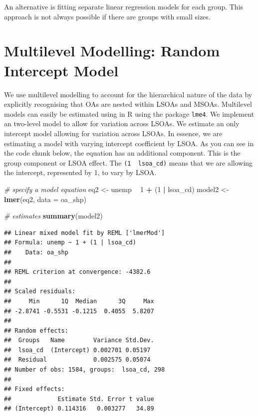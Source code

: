 \documentclass[]{book}
\newenvironment{Shaded}{\begin{snugshade}}{\end{snugshade}}
\newcommand{\KeywordTok}[1]{\textcolor[rgb]{0.13,0.29,0.53}{\textbf{#1}}}
\newcommand{\DataTypeTok}[1]{\textcolor[rgb]{0.13,0.29,0.53}{#1}}
\newcommand{\DecValTok}[1]{\textcolor[rgb]{0.00,0.00,0.81}{#1}}
\newcommand{\StringTok}[1]{\textcolor[rgb]{0.31,0.60,0.02}{#1}}
\newcommand{\CommentTok}[1]{\textcolor[rgb]{0.56,0.35,0.01}{\textit{#1}}}
\newcommand{\OperatorTok}[1]{\textcolor[rgb]{0.81,0.36,0.00}{\textbf{#1}}}
\newcommand{\NormalTok}[1]{#1}
\begin{document}
An alternative is fitting separate linear regression models for each
group. This approach is not always possible if there are groups with
small sizes.

\section{Multilevel Modelling: Random Intercept
Model}\label{multilevel-modelling-random-intercept-model}

We use multilevel modelling to account for the hierarchical nature of
the data by explicitly recognising that OAs are nested within LSOAs and
MSOAs. Multilevel models can easily be estimated using in R using the
package \texttt{lme4}. We implement an two-level model to allow for
variation across LSOAs. We estimate an only intercept model allowing for
variation across LSOAs. In essence, we are estimating a model with
varying intercept coefficient by LSOA. As you can see in the code chunk
below, the equation has an additional component. This is the group
component or LSOA effect. The \texttt{(1\ \textbar{}\ lsoa\_cd)} means
that we are allowing the intercept, represented by 1, to vary by LSOA.

\begin{Shaded}
\begin{Highlighting}[]
\CommentTok{# specify a model equation}
\NormalTok{eq2 <-}\StringTok{ }\NormalTok{unemp }\OperatorTok{~}\StringTok{ }\DecValTok{1} \OperatorTok{+}\StringTok{ }\NormalTok{(}\DecValTok{1} \OperatorTok{|}\StringTok{ }\NormalTok{lsoa_cd)}
\NormalTok{model2 <-}\StringTok{ }\KeywordTok{lmer}\NormalTok{(eq2, }\DataTypeTok{data =}\NormalTok{ oa_shp)}

\CommentTok{# estimates}
\KeywordTok{summary}\NormalTok{(model2)}
\end{Highlighting}
\end{Shaded}

\begin{verbatim}
## Linear mixed model fit by REML ['lmerMod']
## Formula: unemp ~ 1 + (1 | lsoa_cd)
##    Data: oa_shp
## 
## REML criterion at convergence: -4382.6
## 
## Scaled residuals: 
##     Min      1Q  Median      3Q     Max 
## -2.8741 -0.5531 -0.1215  0.4055  5.8207 
## 
## Random effects:
##  Groups   Name        Variance Std.Dev.
##  lsoa_cd  (Intercept) 0.002701 0.05197 
##  Residual             0.002575 0.05074 
## Number of obs: 1584, groups:  lsoa_cd, 298
## 
## Fixed effects:
##             Estimate Std. Error t value
## (Intercept) 0.114316   0.003277   34.89
\end{verbatim}
\end{document}
